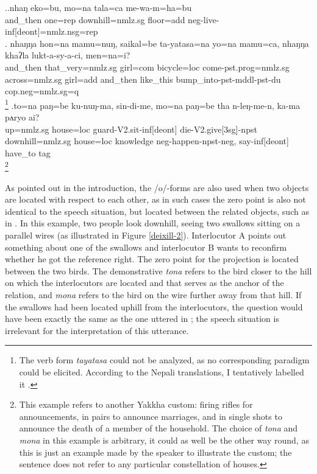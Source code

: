 \ex.\ag.\label{mewamhabu}nhaŋ eko=bu,    mo=na tala=ca         me-wa-m=ha=bu\\
and\_then one{\sc =rep} downhill{\sc =nmlz.sg} floor{\sc =add} {\sc neg-}live{\sc -inf[deont]=nmlz.nsg=rep} \\
 
\bg. nhaŋŋa hon=na mamu=nuŋ, saikal=be ta-yatasa=na yo=na mamu=ca, nhaŋŋa khaʔla lukt-a-sy-a-ci,  men=na=i?	\\
	and\_then that\_very{\sc =nmlz.sg} girl{\sc =com} bicycle{\sc =loc} come{\sc [3sg]-pst.prog=nmlz.sg} across{\sc =nmlz.sg} girl{\sc =add} and\_then like\_this bump\_into{\sc -pst-mddl-pst-du} {\sc cop.neg=nmlz.sg=q}\\
\footnote{The verb form \emph{tayatasa} could not be analyzed, as no corresponding paradigm could be elicited. According to the Nepali translations, I tentatively labelled it .} 
\bg.to=na  paŋ=be     ku-nuŋ-ma, sin-di-me,  mo=na  paŋ=be     tha  n-leŋ-me-n, ka-ma pʌryo  ai?\\
up{\sc =nmlz.sg} house{\sc =loc} guard{\sc -V2.sit-inf[deont]} die{\sc -V2.give[3sg]-npst} downhill{\sc =nmlz.sg} house{\sc =loc} knowledge {\sc neg-}happen{\sc [3sg]-npst-neg}, say{\sc -inf[deont]} have\_to {\sc tag}\\
\footnote{This example refers to another Yakkha custom: firing rifles for announcements, in pairs to announce marriages, and in single shots to announce the death of a  member of the household. The choice of \emph{tona} and \emph{mona} in this example is arbitrary, it could as well be the other way round, as this is just an example made by the speaker to illustrate the custom; the sentence does not refer to any particular constellation of houses.} 	 
   			
			
As pointed out in the introduction, the /o/-forms are also used when two objects are located with respect to each other, as in such cases the zero point is also not identical to the speech situation, but located between the related objects, such as in \Next. In this example, two people look downhill, seeing two swallows  sitting on a parallel wires (as illustrated in Figure \ref{deixill-2}). Interlocutor A points out something about one of the  swallows and interlocutor B wants to reconfirm whether he got the reference right. The  zero point for the projection is located between the two birds. The demonstrative \emph{tona} refers to the bird closer to the hill on which the interlocutors are located and that serves as the anchor of the relation, and \emph{mona} refers to the bird on the wire  further away from that hill. If the swallows had been located uphill from the interlocutors, the question would have been exactly the same as the one uttered in \Next; the speech situation is irrelevant for the interpretation of this utterance.

